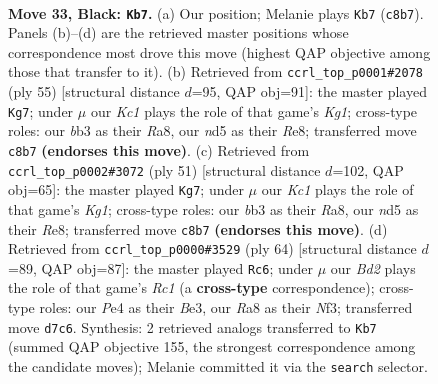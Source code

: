 \documentclass[11pt]{article}
\begin{document}
\clearpage

\begin{figure}[p]\centering
\begin{subfigure}{0.46\textwidth}\centering
\resizebox{\linewidth}{!}{%
\newchessgame
\chessboard[
  setfen={r1k1r3/2pb4/pp1n1B2/P2N1p2/4p2R/1B6/1P2KPP1/R3N3 b - - 2 33},
  showmover=false,
  pgfstyle=straightmove, color=movearrow, markmove={c8-b7}
]}
\caption{}
\end{subfigure}\hfill
\begin{subfigure}{0.46\textwidth}\centering
\resizebox{\linewidth}{!}{%
\newchessgame
\chessboard[
  setfen={r3r1k1/1b3p2/p4n1p/3p2p1/2pR1PP1/2N5/PPP1B2P/2K3R1 b - - 0 28},
  showmover=false,
  pgfstyle=straightmove, color=movearrow, markmove={g8-g7}
]}
\caption{}
\end{subfigure}
\\[4pt]
\begin{subfigure}{0.46\textwidth}\centering
\resizebox{\linewidth}{!}{%
\newchessgame
\chessboard[
  setfen={r3r1k1/1b3p2/p4n1p/3p2p1/2pR2P1/2N2P2/PPP1B2P/2K3R1 b - - 2 26},
  showmover=false,
  pgfstyle=straightmove, color=movearrow, markmove={g8-g7}
]}
\caption{}
\end{subfigure}\hfill
\begin{subfigure}{0.46\textwidth}\centering
\resizebox{\linewidth}{!}{%
\newchessgame
\chessboard[
  setfen={6k1/4p1b1/4np2/1p1rPp1p/3P3P/r3BN2/5PP1/2R1R1K1 w - - 0 33},
  showmover=false,
  pgfstyle=straightmove, color=movearrow, markmove={c1-c6}
]}
\caption{}
\end{subfigure}
\caption{\textbf{Move 33, Black: \texttt{Kb7}.} (a) Our position; Melanie plays \texttt{Kb7} (\texttt{c8b7}). Panels (b)--(d) are the retrieved master positions whose correspondence most drove this move (highest QAP objective among those that transfer to it). (b) Retrieved from \texttt{ccrl\_top\_p0001\#2078} (ply 55) [structural distance $d$=95, QAP obj=91]: the master played \texttt{Kg7}; under $\mu$ our \emph{Kc1} plays the role of that game's \emph{Kg1}; cross-type roles: our \emph{b}b3 as their \emph{R}a8, our \emph{n}d5 as their \emph{R}e8; transferred move \texttt{c8b7} \textbf{(endorses this move)}. (c) Retrieved from \texttt{ccrl\_top\_p0002\#3072} (ply 51) [structural distance $d$=102, QAP obj=65]: the master played \texttt{Kg7}; under $\mu$ our \emph{Kc1} plays the role of that game's \emph{Kg1}; cross-type roles: our \emph{b}b3 as their \emph{R}a8, our \emph{n}d5 as their \emph{R}e8; transferred move \texttt{c8b7} \textbf{(endorses this move)}. (d) Retrieved from \texttt{ccrl\_top\_p0000\#3529} (ply 64) [structural distance $d$=89, QAP obj=87]: the master played \texttt{Rc6}; under $\mu$ our \emph{Bd2} plays the role of that game's \emph{Rc1} (a \textbf{cross-type} correspondence); cross-type roles: our \emph{P}e4 as their \emph{B}e3, our \emph{R}a8 as their \emph{N}f3; transferred move \texttt{d7c6}. Synthesis: 2 retrieved analogs transferred to \texttt{Kb7} (summed QAP objective 155, the strongest correspondence among the candidate moves); Melanie committed it via the \texttt{search} selector.}
\label{fig:thought-m65}
\end{figure}
\end{document}
